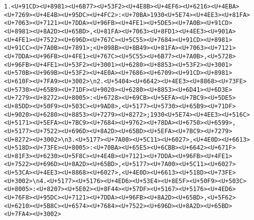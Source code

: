 \documentclass[
]{article}
\begin{document}
\begin{verbatim}
1.<U+91CD><U+8981><U+6B77><U+53F2><U+4E8B><U+4EF6><U+6216><U+4EBA><U+7269><U+4E4B><U+95DC><U+4FC2>:<U+70BA>1930<U+5E74><U+4EE3><U+81FA><U+7063><U+7121><U+7DDA><U+96FB><U+4FE1><U+5DE5><U+7A0B><U+91CD><U+8981><U+8A2D><U+65BD>,<U+81FA><U+7063><U+8FD1><U+4EE3><U+901A><U+4FE1><U+7522><U+696D><U+767C><U+5C55><U+7684><U+91CD><U+8981><U+91CC><U+7A0B><U+7891>;<U+898B><U+8B49><U+81FA><U+7063><U+7121><U+7DDA><U+96FB><U+4FE1><U+767C><U+5C55><U+6B77><U+7A0B>,<U+5728><U+96FB><U+4FE1><U+53F2><U+3001><U+6280><U+8853><U+53F2><U+3001><U+570B><U+969B><U+53F2><U+4E0A><U+7686><U+6709><U+91CD><U+8981><U+610F><U+7FA9><U+3002>\n2.<U+5404><U+6642><U+4EE3><U+8868><U+73FE><U+5730><U+65B9><U+71DF><U+9020><U+6280><U+8853><U+6D41><U+6D3E><U+7279><U+8272><U+8005>:<U+6728><U+69CB><U+5EFA><U+7BC9><U+5DE5><U+85DD><U+50F9><U+503C><U+9AD8>,<U+5177><U+5730><U+65B9><U+71DF><U+9020><U+6280><U+8853><U+7279><U+8272>;1930<U+5E74><U+4EE3><U+516C><U+5171><U+5EFA><U+7BC9><U+7684><U+9762><U+78DA><U+6750><U+6599>,<U+5177><U+7522><U+696D><U+8A2D><U+65BD><U+5EFA><U+7BC9><U+7279><U+8272><U+3002>\n3.<U+5177><U+7A00><U+5C11><U+6027>,<U+4E0D><U+6613><U+518D><U+73FE><U+8005>:<U+70BA><U+65E5><U+6CBB><U+6642><U+671F><U+81F3><U+6230><U+5F8C><U+4E4B><U+7121><U+7DDA><U+96FB><U+4FE1><U+7522><U+696D><U+8A2D><U+65BD>,<U+5177><U+7A00><U+5C11><U+6027><U+53CA><U+4EE3><U+8868><U+6027>,<U+4E0D><U+6613><U+518D><U+73FE><U+3002>\n4.<U+5177><U+5176><U+4ED6><U+53E4><U+8E5F><U+50F9><U+503C><U+8005>:<U+8207><U+5E02><U+8F44><U+57DF><U+5167><U+5176><U+4ED6><U+76F8><U+95DC><U+7121><U+7DDA><U+96FB><U+8A2D><U+65BD>,<U+5F62><U+6210><U+5B8C><U+6574><U+7684><U+7522><U+696D><U+8A2D><U+65BD><U+7FA4><U+3002>

\end{verbatim}
\end{document}
